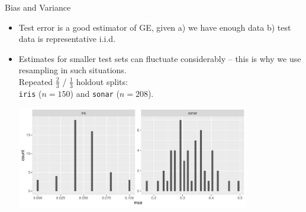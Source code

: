 \begin{vbframe}{Bias and Variance}

\begin{itemize}
  \item Test error is a good estimator of GE,
  given a) we have enough data b) test data is representative i.i.d.
   \item Estimates for smaller test sets can fluctuate considerably -- this is why we use resampling in such situations.\\
   Repeated $\tfrac{2}{3}$ / $\tfrac{1}{3}$ holdout splits:\\
\texttt{iris} ($n=150$) and \texttt{sonar} ($n=208$).\\

\vfill

\begin{center}
\includegraphics[width=0.8\textwidth]{figure/test-error-flucuation} 
\end{center}
\end{itemize}


\end{vbframe}

